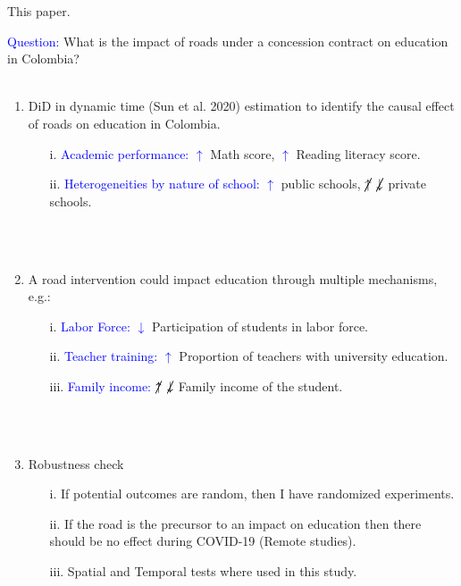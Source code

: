 \documentclass[9pt]{beamer}
\begin{document}

\begin{frame}{This paper.}
\justifying

\textcolor{blue}{Question: } What is the impact of roads under a concession contract on education in Colombia? \\~\\
\pause
    \begin{enumerate}
        \item DiD in dynamic time (Sun et al. 2020) estimation to identify the causal effect of roads on education in Colombia. 
        \pause
        \begin{itemize}  
            \item[i. ] \textcolor{blue}{Academic performance:} \textcolor{blue}{$\uparrow$} Math score,  \textcolor{blue}{$\uparrow$} Reading literacy score.
            \item[ii. ] \textcolor{blue}{Heterogeneities by nature of school:} \textcolor{blue}{$\uparrow$}  public schools, \textcolor{blue}{$\cancel{\uparrow}$ } \textcolor{blue}{$\cancel{\downarrow}$ }  private schools.
        \end{itemize} \\~\\
        \pause
       \item A road intervention could impact education through multiple mechanisms, e.g.:
        \begin{itemize}  
            \item[i. ] \textcolor{blue}{Labor Force:} \textcolor{blue}{$\downarrow$}  Participation of students in labor force.
            \item[ii. ] \textcolor{blue}{Teacher training:} \textcolor{blue}{$\uparrow$}  Proportion of teachers with university education.
            \item[iii. ] \textcolor{blue}{Family income:} \textcolor{blue}{$\cancel{\uparrow}$ } \textcolor{blue}{$\cancel{\downarrow}$ } Family income of the student.
        \end{itemize} \\~\\
        \pause
        \item Robustness check
        \begin{itemize}  
            \item[i. ] If potential outcomes are random, then  I have randomized experiments. 
             \item[ii. ] If the road is the precursor to an impact on education then there should be no effect during COVID-19 (Remote studies).
             \item[iii. ] Spatial and Temporal tests where used in this study.
        \end{itemize} \\~\\
    \end{enumerate}
 

\end{frame}
\end{document}

